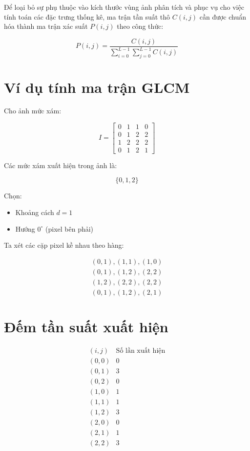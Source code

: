 Để loại bỏ sự phụ thuộc vào kích thước vùng ảnh phân tích và phục vụ cho việc tính toán các đặc trưng thống kê, ma trận tần suất thô $C(i, j)$ cần được chuẩn hóa thành ma trận xác suất $P(i, j)$ theo công thức:

\begin{equation}
P(i, j) = \frac{C(i, j)}{\sum_{i=0}^{L-1} \sum_{j=0}^{L-1} C(i, j)}
\label{eq:glcm_normalization}
\end{equation}

\section*{Ví dụ tính ma trận GLCM}

Cho ảnh mức xám:

\[
I=
\begin{bmatrix}
0 & 1 & 1 & 0\\
0 & 1 & 2 & 2\\
1 & 2 & 2 & 2\\
0 & 1 & 2 & 1
\end{bmatrix}
\]

Các mức xám xuất hiện trong ảnh là:

\[
\{0,1,2\}
\]

Chọn:

\begin{itemize}
    \item Khoảng cách \(d = 1\)
    \item Hướng \(0^\circ\) (pixel bên phải)
\end{itemize}

Ta xét các cặp pixel kề nhau theo hàng:

\begin{align*}
(0,1),(1,1),(1,0) \\
(0,1),(1,2),(2,2) \\
(1,2),(2,2),(2,2) \\
(0,1),(1,2),(2,1) 
\end{align*}

\section*{Đếm tần suất xuất hiện}

\[
\begin{array}{c|c}
(i,j) & \text{Số lần xuất hiện} \\
\hline
(0,0) & 0 \\
(0,1) & 3 \\
(0,2) & 0 \\
(1,0) & 1 \\
(1,1) & 1 \\
(1,2) & 3 \\
(2,0) & 0 \\
(2,1) & 1 \\
(2,2) & 3
\end{array}
\]

